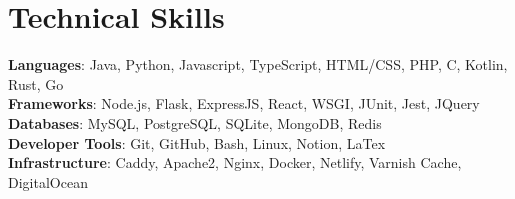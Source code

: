 \documentclass[letterpaper,11pt]{article}
\newcommand{\resumeItem}[1]{
  \item\small{
    {#1 \vspace{-2pt}}
  }
}
\newcommand{\resumeSubItem}[1]{\resumeItem{#1}\vspace{-4pt}}
\newcommand{\resumeSubHeadingListStart}{\begin{itemize}[leftmargin=0.15in, label={}]}
\newcommand{\resumeSubHeadingListEnd}{\end{itemize}}
\begin{document}

  \section{Technical Skills}
\begin{itemize}[leftmargin=0.15in, label={}]
   \small{\item{
    \textbf{Languages}{:  Java, Python, Javascript, TypeScript, HTML/CSS, PHP, C, Kotlin, Rust, Go} \\
    \textbf{Frameworks}{: Node.js, Flask, ExpressJS, React, WSGI, JUnit, Jest, JQuery} \\
    \textbf{Databases}{: MySQL, PostgreSQL, SQLite, MongoDB, Redis} \\
    \textbf{Developer Tools}{: Git, GitHub, Bash, Linux, Notion, LaTex} \\
    \textbf{Infrastructure}{: Caddy, Apache2, Nginx, Docker, Netlify, Varnish Cache, DigitalOcean}
    }}
\end{itemize}

    
\end{document}
